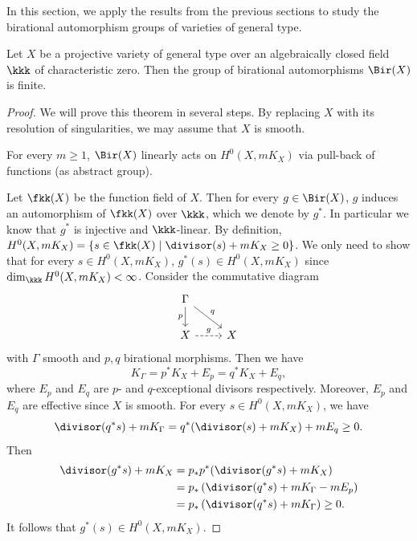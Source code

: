 In this section, we apply the results from the previous sections to study the birational automorphism groups of varieties of general type.

    \begin{theorem}\label{thm:birational_group_of_varieties_of_general_type}
        Let \(X\) be a projective variety of general type over an algebraically closed field \(\kkk\) of characteristic zero. 
        Then the group of birational automorphisms \(\Bir(X)\) is finite.
    \end{theorem}
    \begin{proof}
        We will prove this theorem in several steps.
        By replacing \(X\) with its resolution of singularities, we may assume that \(X\) is smooth.

        \begin{step}\label{step_in_thm:birational_group_of_varieties_of_general_type:pluricanonical_representation}
            For every \(m \geq 1\), \(\Bir(X)\) linearly acts on \(H^0(X, mK_X)\) via pull-back of functions (as abstract group).
        \end{step}

        Let \(\fkk(X)\) be the function field of \(X\).
        Then for every \(g \in \Bir(X)\), \(g\) induces an automorphism of \(\fkk(X)\) over \(\kkk\), which we denote by \(g^*\).
        In particular we know that \(g^*\) is injective and \(\kkk\)-linear.
        By definition, \(H^0(X,mK_X) = \{ s \in \fkk(X) \mid \divisor(s) + mK_X \geq 0 \} \).
        We only need to show that for every \(s \in H^0(X,mK_X)\), \(g^*(s) \in H^0(X,mK_X)\) since \(\dim_\kkk H^0(X,mK_X) < \infty\).
        Consider the commutative diagram
        \[ \begin{tikzcd}
            \Gamma \arrow[d, "p"'] \arrow[rd, "q"] & \\
            X \arrow[r, dashed, "g"] & X
        \end{tikzcd} \]
        with \(\Gamma\) smooth and \(p,q\) birational morphisms.
        Then we have
        \[ K_\Gamma = p^*K_X + E_p = q^*K_X + E_q, \]
        where \(E_p\) and \(E_q\) are \(p\)- and \(q\)-exceptional divisors respectively.
        Moreover, \(E_p\) and \(E_q\) are effective since \(X\) is smooth.
        For every \(s \in H^0(X,mK_X)\), we have
        \[ \divisor (q^*s) + mK_\Gamma = q^*(\divisor(s) + mK_X) + mE_q \geq 0. \]
        Then
        \begin{align*}
            \divisor (g^*s) + mK_X &= p_* p^*(\divisor (g^*s) + mK_X) \\
            &= p_* \left(\divisor (q^*s) + mK_\Gamma - mE_p\right) \\
            &= p_* \left(\divisor (q^*s) + mK_\Gamma\right) \geq 0.
        \end{align*}
        It follows that \(g^*(s) \in H^0(X,mK_X)\).


\end{proof}
